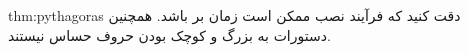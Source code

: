 \begin{theo}{thm:pythagoras}
{
    \Large
    دقت کنید که فرآیند نصب ممکن است زمان بر باشد. همچنین دستورات  به بزرگ و کوچک بودن حروف حساس نیستند.
}
\end{theo}

\newpage